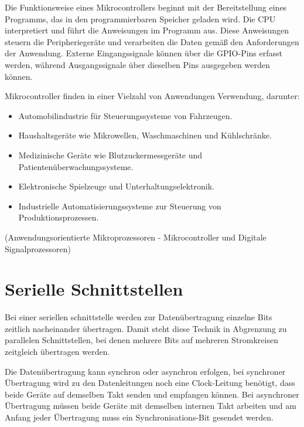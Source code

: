 Die Funktionsweise eines Mikrocontrollers beginnt mit der Bereitstellung eines Programms, das in den programmierbaren
Speicher geladen wird. Die \ac{CPU} interpretiert und führt die Anweisungen im Programm aus. Diese Anweisungen steuern die
Peripheriegeräte und verarbeiten die Daten gemäß den Anforderungen der Anwendung. Externe Eingangssignale können über
die \ac{GPIO}-Pins erfasst werden, während Ausgangssignale über dieselben Pins ausgegeben werden können.

\clearpage

Mikrocontroller finden in einer Vielzahl von Anwendungen Verwendung, darunter:
\begin{itemize}
    \item Automobilindustrie für Steuerungssysteme von Fahrzeugen.
    \item Haushaltsgeräte wie Mikrowellen, Waschmaschinen und Kühlschränke.
    \item Medizinische Geräte wie Blutzuckermessgeräte und Patientenüberwachungssysteme.
    \item Elektronische Spielzeuge und Unterhaltungselektronik.
    \item Industrielle Automatisierungssysteme zur Steuerung von Produktionsprozessen.
\end{itemize}
(Anwendungsorientierte Mikroprozessoren - Mikrocontroller und Digitale
Signalprozessoren\cite{Bähring2010})

\section{Serielle Schnittstellen}
Bei einer seriellen schnittstelle werden zur Datenübertragung einzelne Bits zeitlich nacheinander übertragen.
Damit steht diese Technik in Abgrenzung zu parallelen Schnittstellen, bei denen mehrere Bits auf mehreren
Stromkreisen zeitgleich übertragen werden.

Die Datenübertragung kann synchron oder asynchron erfolgen, bei synchroner Übertragung wird zu den
Datenleitungen noch eine Clock-Leitung benötigt, dass beide Geräte auf demselben Takt senden und empfangen
können. Bei asynchroner Übertragung müssen beide Geräte mit demselben internen Takt arbeiten und am Anfang
jeder Übertragung muss ein Synchronisations-Bit gesendet werden.

